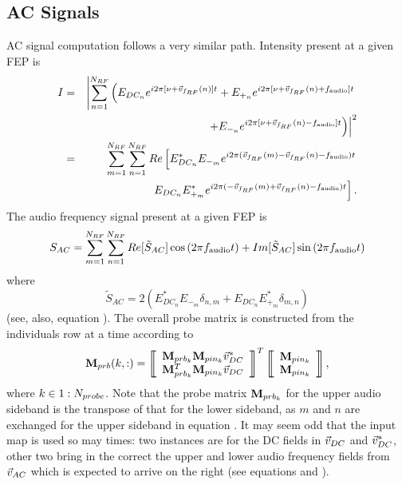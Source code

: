 \documentclass[12pt]{article}
\begin{document}
\subsection{AC Signals}
AC signal computation follows a very similar path. Intensity present at a given FEP is
\begin{eqnarray}
I &=& \left| \sum^{\Nrf}_{n = 1} \left( E_{DC_n} e^{i 2 \pi [\nu + \vFrf(n)] t} + E_{+_n} e^{i 2 \pi [\nu + \vFrf(n) + f_{\rm audio}] t} \right. \right. \nonumber \\
  & & \left. \left.+ E_{-_n} e^{i 2 \pi [\nu + \vFrf(n) - f_{\rm audio}] t} \right) \right|^2 \\
 &=& \sum^{\Nrf}_{m = 1} \sum^{\Nrf}_{n = 1} Re \left[ E^*_{DC_n} E_{-_m} e^{i 2 \pi (\vFrf(m) - \vFrf(n) - f_{\rm audio} ) t} \right. \nonumber \\
 & & \left. E_{DC_n} E_{+_m}^{*} e^{i 2 \pi (-\vFrf(m) + \vFrf(n) - f_{\rm audio} ) t} \right] .
\elabel{intensity}
\end{eqnarray}
The audio frequency signal present at a given FEP is
\begin{equation}
S_{AC} = \sum^{\Nrf}_{m = 1} \sum^{\Nrf}_{n = 1}
Re[ \tilde{S}_{AC} ] \cos{(2 \pi f_{\rm audio} t)} + Im[ \tilde{S}_{AC} ] \sin{(2 \pi f_{\rm audio} t)}
\elabel{sac}
\end{equation}
where
\begin{equation}
\tilde{S}_{AC} = 2 (E^*_{DC_n} E_{-_m} \delta_{n,m} + E_{DC_n} E^*_{+_m} \delta_{m,n})
\end{equation}
(see, also, equation ).
The overall probe matrix is constructed from the individuals row at a time according to
\begin{equation}
\mPrb(k,:) =
\matrixBegin{c}
\mPrbn{k} \mPrbInn{k} \vDC^* \\
\mPrbn{k}^T \mPrbInn{k} \vDC
\matrixEnd ^T
\matrixBegin{c}
\mPrbInn{k} \\
\mPrbInn{k}
\matrixEnd ,
\end{equation}
where $k \in 1:N_{probe}$.
Note that the probe matrix $\mathbf{M}_{prb_{k}}$ for the upper audio sideband is the transpose of that for the lower sideband, as $m$ and $n$ are exchanged for the upper sideband in equation .
It may seem odd that the input map is used so may times: two instances are for the DC fields in $\vec{v}_{DC}$ and $\vec{v}_{DC}^*$, other two bring in the correct the upper and lower audio frequency fields from $\vec{v}_{AC}$ which is expected to arrive on the right (see equations  and ).

\end{document}
